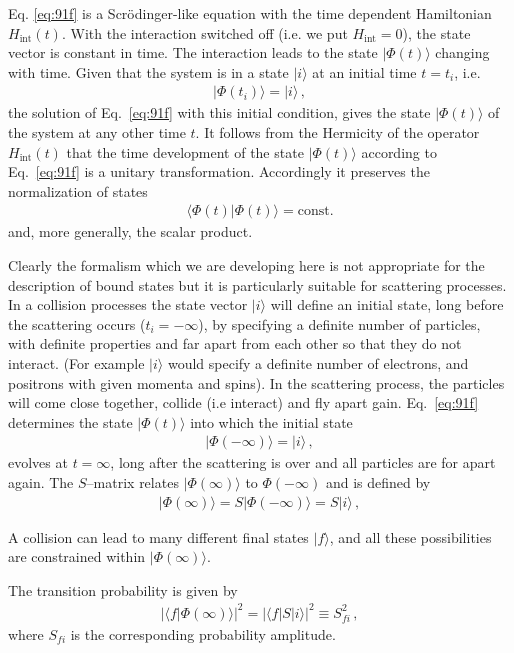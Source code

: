 Eq. \eqref{eq:91f} is a Scr\"odinger-like equation with the time dependent Hamiltonian $H_{\text{int}}(t)$. With the interaction switched off (i.e.  we put $H_{\text{int}}=0$), the state vector is constant in time. The interaction leads to the state $|\Phi(t)\rangle$ changing with time. Given that the system is in a state  $|i\rangle$ at an initial time $t=t_i$, i.e.
\begin{align}
\label{eq:93f}
  |\Phi(t_i)\rangle=|i\rangle\,,
\end{align}
the solution of Eq.~\eqref{eq:91f} with this initial condition, gives the state $|\Phi(t)\rangle$ of the system at any other time $t$. It follows from the Hermicity of the operator $H_{\text{int}}(t)$ that the time development of the state $|\Phi(t)\rangle$ according to Eq.~\eqref{eq:91f} is a unitary transformation. Accordingly it preserves the normalization of states
\begin{align}
  \langle\Phi(t)|\Phi(t)\rangle=\text{const}.
\end{align}
and, more generally, the scalar product.

Clearly the formalism which we are developing here is not appropriate for the description of bound states but it is particularly suitable for scattering processes. In a collision processes the state vector $|i\rangle$ will define an initial state, long before the scattering occurs ($t_i=-\infty$), by specifying a definite number of particles, with definite properties and far apart from each other so that they do not interact. (For example $|i\rangle$ would specify a definite number of electrons, and positrons with given momenta and spins). In the scattering process, the particles will come close together, collide (i.e interact) and fly apart gain. Eq.~\eqref{eq:91f} determines the state $|\Phi(t)\rangle$ into which the initial state
\begin{align}
  |\Phi(-\infty)\rangle=|i\rangle\,,
\end{align}
evolves at $t=\infty$, long after the scattering is over and all particles are for apart again. The $S$--matrix relates $|\Phi(\infty)\rangle$ to $\Phi(-\infty)$ and is defined by
\begin{align}
  |\Phi(\infty)\rangle=S|\Phi(-\infty)\rangle=S|i\rangle\,,
\end{align}

A collision can lead to many different final states $|f\rangle$, and all these possibilities are constrained within $|\Phi(\infty)\rangle$.

The transition probability is given by
\begin{align}
  \left|\langle f|\Phi(\infty)\rangle\right|^2=  \left|\langle f|S|i\rangle\right|^2\equiv S_{f i}^2\,,
\end{align}
where $S_{f i}$ is the corresponding probability amplitude.

